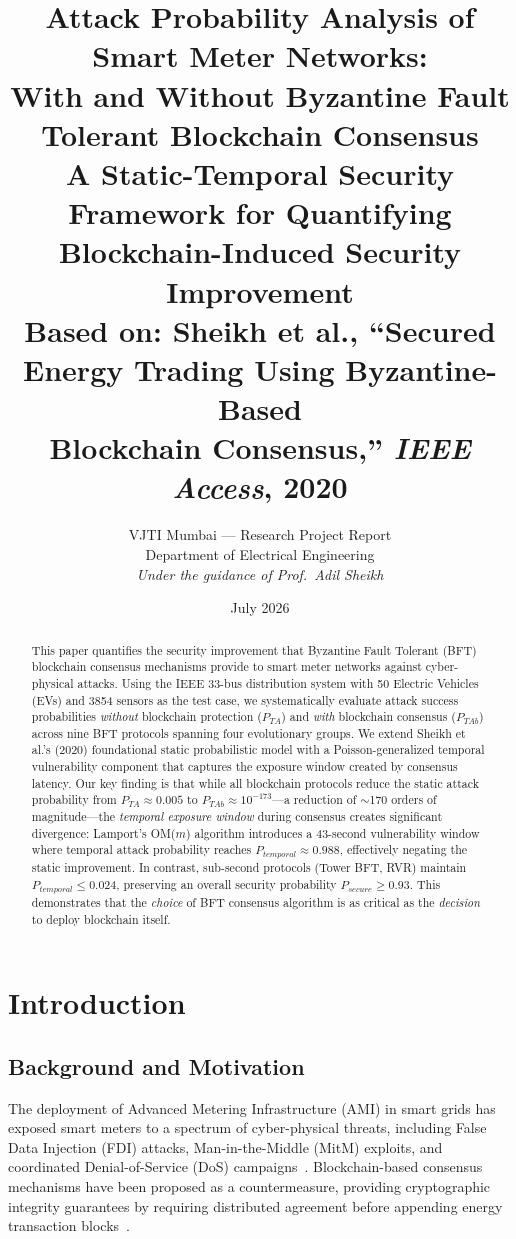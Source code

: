 \documentclass[10pt,twocolumn,letterpaper]{article}
\title{\textbf{Attack Probability Analysis of Smart Meter Networks:\\With and Without Byzantine Fault Tolerant Blockchain Consensus}\\[8pt]
\large A Static-Temporal Security Framework for Quantifying\\Blockchain-Induced Security Improvement\\[4pt]
\normalsize Based on: Sheikh et al., ``Secured Energy Trading Using Byzantine-Based\\Blockchain Consensus,'' \emph{IEEE Access}, 2020}
\author{%
VJTI Mumbai --- Research Project Report\\
Department of Electrical Engineering\\[4pt]
\small \emph{Under the guidance of Prof.\ Adil Sheikh}
}
\date{July 2026}
\begin{document}
\maketitle

\begin{abstract}
This paper quantifies the security improvement that Byzantine Fault Tolerant (BFT) blockchain consensus mechanisms provide to smart meter networks against cyber-physical attacks. Using the IEEE 33-bus distribution system with 50 Electric Vehicles (EVs) and 3854 sensors as the test case, we systematically evaluate attack success probabilities \emph{without} blockchain protection ($P_{TA}$) and \emph{with} blockchain consensus ($P_{TAb}$) across nine BFT protocols spanning four evolutionary groups. We extend Sheikh et al.'s (2020) foundational static probabilistic model with a Poisson-generalized temporal vulnerability component that captures the exposure window created by consensus latency. Our key finding is that while all blockchain protocols reduce the static attack probability from $P_{TA} \approx 0.005$ to $P_{TAb} \approx 10^{-173}$---a reduction of $\sim$170 orders of magnitude---the \emph{temporal exposure window} during consensus creates significant divergence: Lamport's OM($m$) algorithm introduces a 43-second vulnerability window where temporal attack probability reaches $P_{temporal} \approx 0.988$, effectively negating the static improvement. In contrast, sub-second protocols (Tower BFT, RVR) maintain $P_{temporal} \leq 0.024$, preserving an overall security probability $P_{secure} \geq 0.93$. This demonstrates that the \emph{choice} of BFT consensus algorithm is as critical as the \emph{decision} to deploy blockchain itself.
\end{abstract}

\section{Introduction}
\label{sec:introduction}

\subsection{Background and Motivation}

The deployment of Advanced Metering Infrastructure (AMI) in smart grids has exposed smart meters to a spectrum of cyber-physical threats, including False Data Injection (FDI) attacks, Man-in-the-Middle (MitM) exploits, and coordinated Denial-of-Service (DoS) campaigns~\cite{sheikh2020, baumeister2010}. Blockchain-based consensus mechanisms have been proposed as a countermeasure, providing cryptographic integrity guarantees by requiring distributed agreement before appending energy transaction blocks~\cite{sheikh2020, li2020}.
\end{document}
